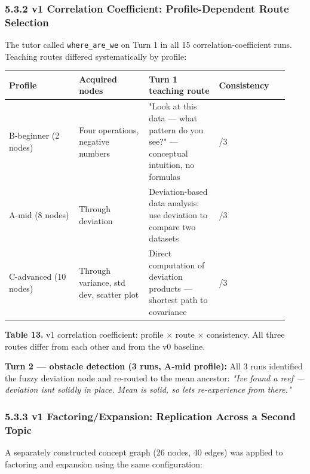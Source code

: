 \documentclass[
]{article}
\newcounter{none} %
\begin{document}
\subsubsection{5.3.2 v1 Correlation Coefficient: Profile-Dependent Route Selection}\label{532-v1-correlation-coefficient-profile-dependent-route-selection}

The tutor called \texttt{where\_are\_we} on Turn 1 in all 15 correlation-coefficient runs. Teaching routes differed systematically by profile:

{\def\LTcaptype{none} %
\begin{longtable}[]{@{}>{\raggedright\arraybackslash}p{0.233\linewidth}>{\raggedright\arraybackslash}p{0.233\linewidth}>{\raggedright\arraybackslash}p{0.233\linewidth}>{\raggedright\arraybackslash}p{0.233\linewidth}@{}}
\toprule\noalign{}
Profile & Acquired nodes & Turn 1 teaching route & Consistency \\
\midrule\noalign{}
\endhead
\bottomrule\noalign{}
\endlastfoot
B-beginner (2 nodes) & Four operations, negative numbers & "Look at this data --- what pattern do you see?" --- conceptual intuition, no formulas & 3/3 \\
A-mid (8 nodes) & Through deviation & Deviation-based data analysis: use deviation to compare two datasets & 3/3 \\
C-advanced (10 nodes) & Through variance, std dev, scatter plot & Direct computation of deviation products --- shortest path to covariance & 3/3 \\
\end{longtable}
}

\textbf{Table 13.} v1 correlation coefficient: profile × route × consistency. All three routes differ from each other and from the v0 baseline.

\textbf{Turn 2 --- obstacle detection (3 runs, A-mid profile):} All 3 runs identified the fuzzy deviation node and re-routed to the mean ancestor: \emph{"I\textquotesingle ve found a reef --- deviation isn\textquotesingle t solidly in place. Mean is solid, so let\textquotesingle s re-experience from there."}

\subsubsection{5.3.3 v1 Factoring/Expansion: Replication Across a Second Topic}\label{533-v1-factoringexpansion-replication-across-a-second-topic}

A separately constructed concept graph (26 nodes, 40 edges) was applied to factoring and expansion using the same configuration:
\end{document}
